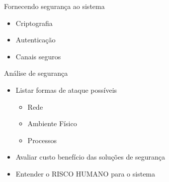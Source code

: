 \documentclass[aspectratio=169,
				xcolor=table]{beamer}
\begin{document}
	\begin{frame}{Fornecendo segurança ao sistema}
		\begin{itemize}
			\item Criptografia
			\vspace{1em}
			\item Autenticação
			\vspace{1em}
			\item Canais seguros
		\end{itemize}
	\end{frame}
	
	\begin{frame}{Análise de segurança}
		\begin{itemize}
			\item Listar formas de ataque possíveis
			\begin{itemize}
				\item Rede
				\item Ambiente Físico
				\item Processos
			\end{itemize}
			\vspace{1em}
			\item Avaliar custo benefício das soluções de segurança
			\vspace{1em}
			\item Entender o RISCO HUMANO para o sistema
		\end{itemize}
	\end{frame}
		
	\begin{frame}{}
	\end{frame}	
\end{document}

